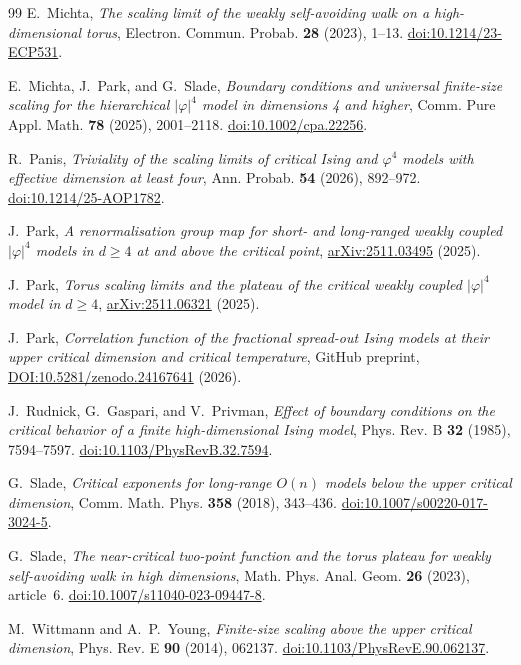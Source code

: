 \documentclass[11pt]{article}
\theoremstyle{definition}
\begin{document}
\begin{thebibliography}{99}
E.~Michta, \emph{The scaling limit of the weakly self-avoiding walk on a
high-dimensional torus}, Electron. Commun. Probab. \textbf{28} (2023), 1--13.
\href{https://doi.org/10.1214/23-ECP531}{doi:10.1214/23-ECP531}.

E.~Michta, J.~Park, and G.~Slade, \emph{Boundary conditions and universal
finite-size scaling for the hierarchical $|\varphi|^4$ model in dimensions
4 and higher}, Comm. Pure Appl. Math. \textbf{78} (2025), 2001--2118.
\href{https://doi.org/10.1002/cpa.22256}{doi:10.1002/cpa.22256}.

R.~Panis, \emph{Triviality of the scaling limits of critical Ising
and $\varphi^4$ models with effective dimension at least four},
Ann. Probab. \textbf{54} (2026), 892--972.
\href{https://doi.org/10.1214/25-AOP1782}{doi:10.1214/25-AOP1782}.

J.~Park, \emph{A renormalisation group map for short- and long-ranged
weakly coupled \(\lvert\varphi\rvert^4\) models in \(d\ge4\) at and
above the critical point},
\href{https://arxiv.org/abs/2511.03495}{arXiv:2511.03495} (2025).

J.~Park, \emph{Torus scaling limits and the plateau of the critical weakly
coupled $|\varphi|^4$ model in $d\ge4$},
\href{https://arxiv.org/abs/2511.06321}{arXiv:2511.06321} (2025).

J.~Park, \emph{Correlation function of the fractional spread-out Ising
models at their upper critical dimension and critical temperature},
GitHub preprint,
\href{https://github.com/jiwoonGit/phi4/blob/main/fractional_spread_out_ising_rg/spread_out_ising_rg.pdf}{DOI:10.5281/zenodo.24167641} (2026).

J.~Rudnick, G.~Gaspari, and V.~Privman,
\emph{Effect of boundary conditions on the critical behavior of a finite
high-dimensional Ising model}, Phys. Rev. B \textbf{32} (1985), 7594--7597.
\href{https://doi.org/10.1103/PhysRevB.32.7594}{doi:10.1103/PhysRevB.32.7594}.

G.~Slade, \emph{Critical exponents for long-range \(O(n)\) models below
the upper critical dimension}, Comm. Math. Phys. \textbf{358} (2018), 343--436.
\href{https://doi.org/10.1007/s00220-017-3024-5}{doi:10.1007/s00220-017-3024-5}.

G.~Slade, \emph{The near-critical two-point function and the torus plateau
for weakly self-avoiding walk in high dimensions},
Math. Phys. Anal. Geom. \textbf{26} (2023), article~6.
\href{https://doi.org/10.1007/s11040-023-09447-8}{doi:10.1007/s11040-023-09447-8}.

M.~Wittmann and A.~P.~Young, \emph{Finite-size scaling above the upper
critical dimension}, Phys. Rev. E \textbf{90} (2014), 062137.
\href{https://doi.org/10.1103/PhysRevE.90.062137}{doi:10.1103/PhysRevE.90.062137}.

\end{thebibliography}
\end{document}
